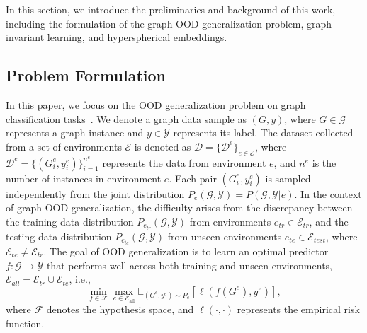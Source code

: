 In this section, we introduce the preliminaries and background of this work, including the formulation of the graph OOD generalization problem, graph invariant learning, and hyperspherical embeddings.

\subsection{Problem Formulation} 
In this paper, we focus on the OOD generalization problem on graph classification tasks~\citep{li2022out,jia2024graph,fan2022debiasing,wu2022discovering}. We denote a graph data sample as $(G,y)$, where $G \in \mathcal{G}$ represents a graph instance and $y \in \mathcal{Y}$ represents its label. The dataset collected from a set of environments $\mathcal{E}$ is denoted as $\mathcal{D} = \{\mathcal{D}^{e}\}_{e \in \mathcal{E}}$, where $\mathcal{D}^{e} =\{({G}^{e}_{i},{y}^{e}_{i})\}^{n^{e}}_{i=1}$ represents the data from environment $e$, and $n^e$ is the number of instances in environment $e$. Each pair $({G}^{e}_{i}, {y}^{e}_{i})$ is sampled independently from the joint distribution $P_{e}(\mathcal{G}, \mathcal{Y}) = P(\mathcal{G}, \mathcal{Y} | e)$. 
In the context of graph OOD generalization, the difficulty arises from the discrepancy between the training data distribution $P_{e_{tr}}(\mathcal{G}, \mathcal{Y})$ from environments $e_{tr} \in \mathcal{E}_{tr}$, and the testing data distribution $P_{e_{te}}(\mathcal{G}, \mathcal{Y})$ from unseen environments $e_{te} \in \mathcal{E}_{test}$, where $\mathcal{E}_{te} \neq \mathcal{E}_{tr}$. The goal of OOD generalization is to learn an optimal predictor $f: \mathcal{G} \rightarrow \mathcal{Y}$ that performs well across both training and unseen environments, $\mathcal{E}_{all} = \mathcal{E}_{tr} \cup \mathcal{E}_{te}$, i.e., 
\begin{equation}
\label{eq: OOD_target} \min_{f \in \mathcal{F}} \max_{e \in \mathcal{E}_{\mathrm{all}}} \mathbb{E}_{(G^{e}, y^{e}) \sim P_{e}}[\ell(f(G^e), y^e)], 
\end{equation}
where $\mathcal{F}$ denotes the hypothesis space, and $\ell(\cdot,\cdot)$ represents the empirical risk function. 


